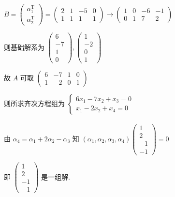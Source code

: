 		 \( B = \begin{pmatrix}
			 \alpha_{1}^{\mathrm{T}} \\
			 \alpha_{2}^{\mathrm{T}}
		 \end{pmatrix} = \begin{pmatrix}
			 2 & 1 & -5 & 0 \\
			 1 & 1 & 1  & 1
		 \end{pmatrix} \rightarrow \begin{pmatrix}
			 1 & 0 & -6 & -1 \\
			 0 & 1 & 7  & 2
		 \end{pmatrix} \)

		 则基础解系为 \( \begin{pmatrix}
			 6  \\
			 -7 \\
			 1  \\
			 0
		 \end{pmatrix}, \begin{pmatrix}
			 1  \\
			 -2 \\
			 0  \\
			 1
		 \end{pmatrix} \)

		 故 \( A \) 可取 \( \begin{pmatrix}
			 6 & -7 & 1 & 0 \\
			 1 & -2 & 0 & 1
		 \end{pmatrix} \)

		 则所求齐次方程组为 \( \begin{cases}
			 6x_{1} - 7x_{2} + x_{3} = 0 \\
			 x_{1} - 2x_{2} + x_{4} = 0
		 \end{cases} \)


	 \paragraph{} %
		 由 \( \alpha_{4} = \alpha_{1} + 2\alpha_{2} - \alpha_{3} \) 知 \( (\alpha_{1}, \alpha_{2}, \alpha_{3}, \alpha_{4}) \begin{pmatrix}
			 1  \\
			 2  \\
			 -1 \\
			 -1
		 \end{pmatrix} = 0 \)

		 即 \( \begin{pmatrix}
			 1  \\
			 2  \\
			 -1 \\
			 -1
		 \end{pmatrix} \) 是一组解.

